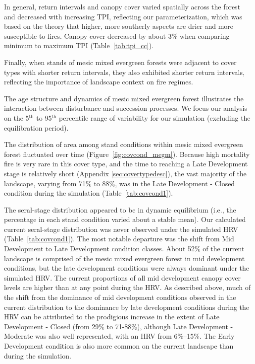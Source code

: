 In general, return intervals and canopy cover varied spatially across the forest and decreased with increasing TPI, reflecting our parameterization, which was based on the theory that higher, more southerly aspects are drier and more susceptible to fires. Canopy cover decreased by about 3\% when comparing minimum to maximum TPI (Table~\ref{tab:tpi_cc}). 

Finally, when stands of mesic mixed evergreen forests were adjacent to cover types with shorter return intervals, they also exhibited shorter return intervals, reflecting the importance of landscape context on fire regimes.

The age structure and dynamics of mesic mixed evergreen forest illustrates the interaction between disturbance and succession processes. We focus our analysis on the 5$^{\text{th}}$ to 95$^{\text{th}}$ percentile range of variability for our simulation (excluding the equilibration period).

The distribution of area among stand conditions within mesic mixed evergreen forest fluctuated over time (Figure~\ref{fig:covcond_megm}). Because high mortality fire is very rare in this cover type, and the time to reaching a Late Development stage is relatively short (Appendix \ref{sec:covertypedesc}), the vast majority of the landscape, varying from 71\% to 88\%, was in the Late Development - Closed condition during the simulation (Table~\ref{tab:covcond1}). 

The seral-stage distribution appeared to be in dynamic equilibrium (i.e., the percentage in each stand condition varied about a stable mean). Our calculated current seral-stage distribution was never observed under the simulated HRV (Table~\ref{tab:covcond1}). The most notable departure was the shift from Mid Development to Late Development condition classes. About 52\% of the current landscape is comprised of the mesic mixed evergreen forest in mid development conditions, but the late development conditions were always dominant under the simulated HRV. The current proportions of all mid development canopy cover levels are higher than at any point during the HRV. As described above, much of the shift from the dominance of mid development conditions observed in the current distribution to the dominance by late development conditions during the HRV can be attributed to the prodigious increase in the extent of Late Development - Closed (from 29\% to 71-88\%), although Late Development - Moderate was also well represented, with an HRV from 6\%--15\%. The Early Development condition is also more common on the current landscape than during the simulation.

